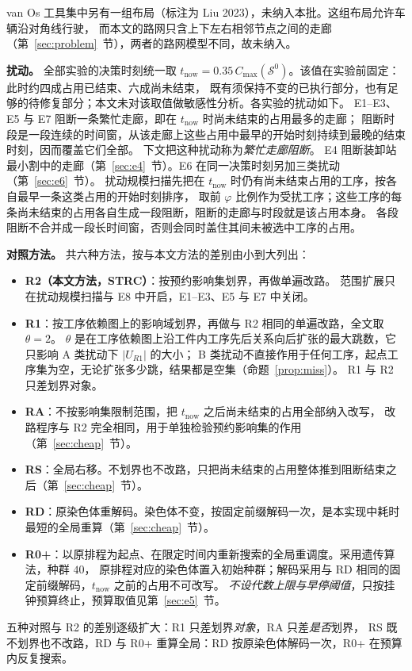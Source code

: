 \documentclass[manuscript,screen,review]{acmart}
\providecommand{\STRC}{\textsc{STRC}}
\begin{document}
van Os 工具集中另有一组布局（标注为 Liu 2023），未纳入本批。这组布局允许车辆沿对角线行驶，
而本文的路网只含上下左右相邻节点之间的走廊（第~\ref{sec:problem}~节），两者的路网模型不同，故未纳入。

\textbf{扰动。}
全部实验的决策时刻统一取 \(t_{\mathrm{now}}=0.35\,C_{\max}(\mathcal{S}^0)\)。该值在实验前固定：此时约四成占用已结束、六成尚未结束，
既有须保持不变的已执行部分，也有足够的待修复部分；本文未对该取值做敏感性分析。各实验的扰动如下。
E1--E3、E5 与 E7 阻断一条繁忙走廊，即在 \(t_{\mathrm{now}}\) 时尚未结束的占用最多的走廊；
阻断时段是一段连续的时间窗，从该走廊上这些占用中最早的开始时刻持续到最晚的结束时刻，因而覆盖它们全部。
下文把这种扰动称为\emph{繁忙走廊阻断}。
E4 阻断装卸站最小割中的走廊（第~\ref{sec:e4}~节）。E6 在同一决策时刻另加三类扰动（第~\ref{sec:e6}~节）。
扰动规模扫描先把在 \(t_{\mathrm{now}}\) 时仍有尚未结束占用的工序，按各自最早一条这类占用的开始时刻排序，
取前 \(\varphi\) 比例作为受扰工序；这些工序的每条尚未结束的占用各自生成一段阻断，阻断的走廊与时段就是该占用本身。
各段阻断不合并成一段长时间窗，否则会同时盖住其间未被选中工序的占用。

\textbf{对照方法。}
共六种方法，按与本文方法的差别由小到大列出：
\begin{itemize}[leftmargin=1.5em,itemsep=0.2em]
\item \textbf{R2（本文方法，\STRC）}：按预约影响集划界，再做单遍改路。
范围扩展只在扰动规模扫描与 E8 中开启，E1--E3、E5 与 E7 中关闭。
\item \textbf{R1}：按工序依赖图上的影响域划界，再做与 R2 相同的单遍改路，全文取 \(\theta=2\)。
\(\theta\) 是在工序依赖图上沿工件内工序先后关系向后扩张的最大跳数，它只影响 A 类扰动下 \(|U_{R1}|\) 的大小；
B 类扰动不直接作用于任何工序，起点工序集为空，无论扩张多少跳，结果都是空集（命题~\ref{prop:miss}）。
R1 与 R2 只差划界对象。
\item \textbf{RA}：不按影响集限制范围，把 \(t_{\mathrm{now}}\) 之后尚未结束的占用全部纳入改写，
改路程序与 R2 完全相同，用于单独检验预约影响集的作用（第~\ref{sec:cheap}~节）。
\item \textbf{RS}：全局右移。不划界也不改路，只把尚未结束的占用整体推到阻断结束之后（第~\ref{sec:cheap}~节）。
\item \textbf{RD}：原染色体重解码。染色体不变，按固定前缀解码一次，是本实现中耗时最短的全局重算（第~\ref{sec:cheap}~节）。
\item \textbf{R0+}：以原排程为起点、在限定时间内重新搜索的全局重调度。采用遗传算法，种群 \(40\)，
原排程对应的染色体置入初始种群；解码采用与 RD 相同的固定前缀解码，\(t_{\mathrm{now}}\) 之前的占用不可改写。
\emph{不设代数上限与早停阈值}，只按挂钟预算终止，预算取值见第~\ref{sec:e5}~节。
\end{itemize}
五种对照与 R2 的差别逐级扩大：R1 只差划界\emph{对象}，RA 只差\emph{是否}划界，
RS 既不划界也不改路，RD 与 R0+ 重算全局：RD 按原染色体解码一次，R0+ 在预算内反复搜索。
\end{document}
